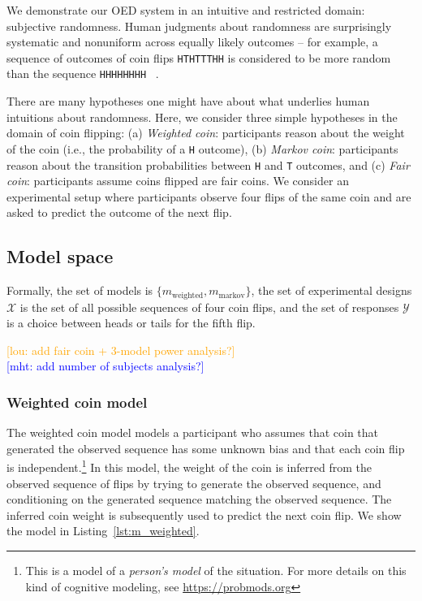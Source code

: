 \documentclass{article}
\newcommand{\mht}[1]{\textcolor{Blue}{[mht: #1]}}
\newcommand{\lou}[1]{\textcolor{orange}{[lou: #1]}}
\begin{document}
We demonstrate our OED system in an intuitive and restricted domain: subjective randomness.
Human judgments about randomness are surprisingly systematic and nonuniform across equally likely outcomes -- for example, a sequence of outcomes of coin flips \lstinline{HTHTTTHH} is considered to be more random than the sequence \lstinline{HHHHHHHH} ~\cite{goodfellow38:jep, griffiths01:cogsci}.

There are many hypotheses one might have about what underlies human intuitions about randomness.
Here, we consider three simple hypotheses in the domain of coin flipping: (a) \emph{Weighted coin}: participants reason about the weight of the coin (i.e., the probability of a \lstinline{H} outcome), (b) \emph{Markov coin}: participants reason about the transition probabilities between \lstinline{H} and \lstinline{T} outcomes, and (c) \emph{Fair coin}: participants assume coins flipped are fair coins.
We consider an experimental setup where participants observe four flips of the same coin and are asked to predict the outcome of the next flip.


\subsection{Model space}


Formally, the set of models is $\{m_{\text{weighted}}, m_{\text{markov}}\}$, the set of experimental designs $\mathcal{X}$ is the set of all possible sequences of four coin flips, and the set of responses $\mathcal{Y}$ is a choice between heads or tails for the fifth flip.

\lou{add fair coin + 3-model power analysis?}\\
\mht{add number of subjects analysis?}

\subsubsection{Weighted coin model}
\label{s:tutorial:sss:biased}

The weighted coin model models a participant who assumes that coin that generated the observed sequence has some unknown bias and that each coin flip is independent.\footnote{This is a model of a \emph{person's model} of the situation. For more details on this kind of cognitive modeling, see \url{https://probmods.org}}
In this model, the weight of the coin is inferred from the observed sequence of flips by trying to generate the observed sequence, and conditioning on the generated sequence matching the observed sequence.
The inferred coin weight is subsequently used to predict the next coin flip. We show the model in Listing~\ref{lst:m_weighted}.
\end{document}

